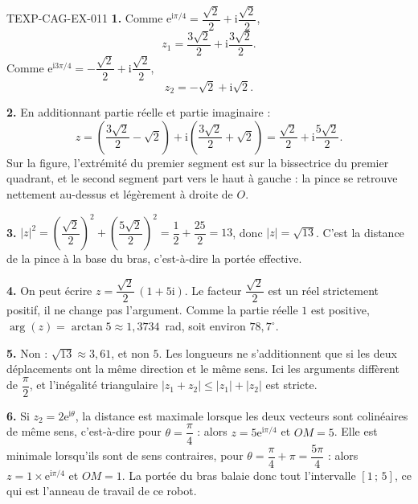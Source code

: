 \begin{corrige}{TEXP-CAG-EX-011}
\textbf{1.} Comme $\mathrm{e}^{\mathrm{i}\pi/4}=\dfrac{\sqrt2}{2}+\mathrm{i}\dfrac{\sqrt2}{2}$,
\[
  z_1=\dfrac{3\sqrt2}{2}+\mathrm{i}\dfrac{3\sqrt2}{2}.
\]
Comme $\mathrm{e}^{\mathrm{i}3\pi/4}=-\dfrac{\sqrt2}{2}+\mathrm{i}\dfrac{\sqrt2}{2}$,
\[
  z_2=-\sqrt2+\mathrm{i}\sqrt2.
\]

\textbf{2.} En additionnant partie réelle et partie imaginaire :
\[
  z=\left(\dfrac{3\sqrt2}{2}-\sqrt2\right)+\mathrm{i}\left(\dfrac{3\sqrt2}{2}+\sqrt2\right)
  =\dfrac{\sqrt2}{2}+\mathrm{i}\dfrac{5\sqrt2}{2}.
\]
Sur la figure, l'extrémité du premier segment est sur la bissectrice du premier
quadrant, et le second segment part vers le haut à gauche : la pince se retrouve
nettement au-dessus et légèrement à droite de $O$.

\textbf{3.} $|z|^2=\left(\dfrac{\sqrt2}{2}\right)^2+\left(\dfrac{5\sqrt2}{2}\right)^2
=\dfrac12+\dfrac{25}{2}=13$, donc $|z|=\sqrt{13}$. C'est la distance de la pince
à la base du bras, c'est-à-dire la portée effective.

\textbf{4.} On peut écrire $z=\dfrac{\sqrt2}{2}\,(1+5\mathrm{i})$. Le facteur
$\dfrac{\sqrt2}{2}$ est un réel strictement positif, il ne change pas
l'argument. Comme la partie réelle $1$ est positive,
$\arg(z)=\arctan 5\approx 1{,}3734$~rad, soit environ $78{,}7^{\circ}$.

\textbf{5.} Non : $\sqrt{13}\approx 3{,}61$, et non $5$. Les longueurs ne
s'additionnent que si les deux déplacements ont la même direction et le même
sens. Ici les arguments diffèrent de $\dfrac{\pi}{2}$, et l'inégalité
triangulaire $|z_1+z_2|\leqslant|z_1|+|z_2|$ est stricte.

\textbf{6.} Si $z_2=2\mathrm{e}^{\mathrm{i}\theta}$, la distance est maximale
lorsque les deux vecteurs sont colinéaires de même sens, c'est-à-dire pour
$\theta=\dfrac{\pi}{4}$ : alors $z=5\mathrm{e}^{\mathrm{i}\pi/4}$ et $OM=5$. Elle
est minimale lorsqu'ils sont de sens contraires, pour
$\theta=\dfrac{\pi}{4}+\pi=\dfrac{5\pi}{4}$ : alors
$z=1\times\mathrm{e}^{\mathrm{i}\pi/4}$ et $OM=1$. La portée du bras balaie donc
tout l'intervalle $[1\,;\,5]$, ce qui est l'anneau de travail de ce robot.
\end{corrige}
